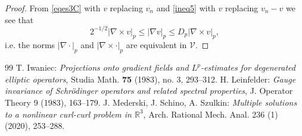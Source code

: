 \documentclass[10pt,a4paper]{amsart}
\def\R{\mathbb{R}}
\newcommand{\cV}{{\mathcal V}}
\def\curlop{\nabla\times}
\numberwithin{equation}{section}
\begin{document}
\begin{proof}
From \eqref{eqes3C} with $v$ replacing $v_n$ and \eqref{ineq5} with $v$ replacing $v_n-v$ we see that
\begin{equation} \label{doubleineq}
2^{-1/2}|\curlop v|_p \le  |\nabla v|_p\leq D_p |\curlop v|_p,
\end{equation}
i.e. the norms $|\nabla\cdot|_p$ and $|\curlop\cdot|_p$ are equivalent in $\cV$.
\end{proof}

\begin{thebibliography}{99}
 T. Iwaniec: {\em Projections onto gradient fields and $L^p$-estimates for degenerated elliptic operators}, Studia Math. {\bf 75} (1983), no. 3, 293--312. 
 H. Leinfelder: \emph{Gauge invariance of Schr\"odinger operators and related spectral properties}, J. Operator Theory 9 (1983), 163--179. 
 J. Mederski, J. Schino, A. Szulkin: {\em Multiple solutions to a nonlinear curl-curl problem in $\R^3$}, Arch. Rational Mech. Anal. 236 (1) (2020), 253--288. 
\end{thebibliography}
\end{document}
